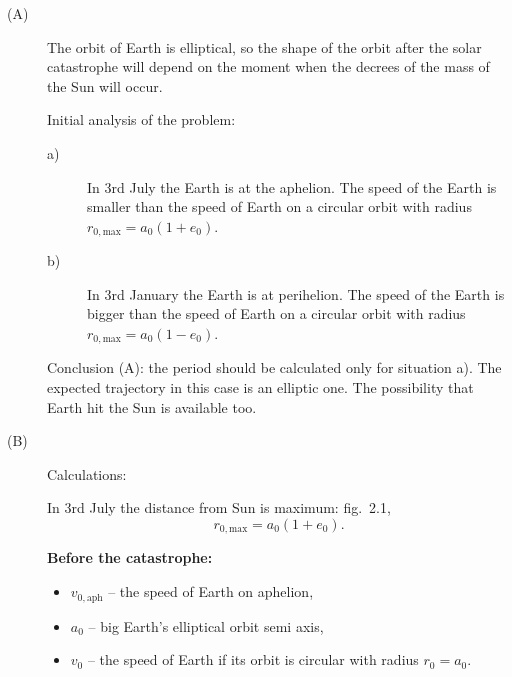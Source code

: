 \begin{description}
\item[(A)] The orbit of Earth is elliptical, so the shape of the orbit after
  the solar catastrophe will depend on the moment when the decrees %
  of the mass of the Sun will occur.

  Initial analysis of the problem:
  \begin{description}
  \item[a)] In 3rd July the Earth is at the aphelion. The speed of the Earth
    is smaller than the speed of Earth on a circular orbit with radius
    $r_{0,\mathrm{max}} = a_0(1 + e_0)$.
  \item[b)] In 3rd January the Earth is at perihelion. The speed of the Earth
    is bigger than the speed of Earth on a circular orbit with radius
    $r_{0,\mathrm{max}} = a_0(1 - e_0)$. %
  \end{description}

  Conclusion (A): the period should be calculated only for situation a). The
  expected trajectory in this case is an elliptic one. The possibility that
  Earth hit the Sun is available too.

\item[(B)] Calculations:

  In 3rd July the distance from Sun is maximum: fig.~2.1,
  \[ r_{0,\mathrm{max}} = a_0(1 + e_0). \]

  \textbf{Before the catastrophe:}
  \begin{itemize}
  \item $v_{0,\mathrm{aph}}$ -- the speed of Earth on aphelion,
  \item $a_0$ -- big Earth's elliptical orbit semi axis,
  \item $v_0$ -- the speed of Earth if its orbit is circular with radius
    $r_0 = a_0$.
  \end{itemize}


\end{description}
